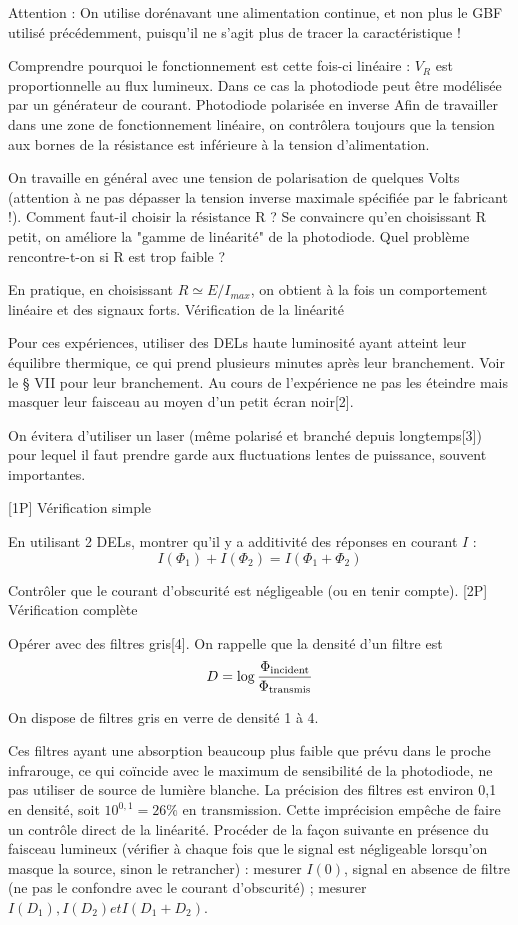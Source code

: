 \documentclass{article}%
\begin{document}
Attention : On utilise dorénavant une alimentation continue, et non plus le GBF utilisé précédemment, puisqu'il ne s'agit plus de tracer la caractéristique !


Comprendre pourquoi le fonctionnement est cette fois-ci linéaire : $V_{R}$ est proportionnelle au flux lumineux. Dans ce cas la photodiode peut être modélisée par un générateur de courant.
Photodiode polarisée en inverse
Afin de travailler dans une zone de fonctionnement linéaire, on contrôlera toujours que la tension aux bornes de la résistance est inférieure à la tension d'alimentation.

On travaille en général avec une tension de polarisation de quelques Volts (attention à ne pas dépasser la tension inverse maximale spécifiée par le fabricant !). Comment faut-il choisir la résistance R ? Se convaincre qu'en choisissant R petit, on améliore la "gamme de linéarité" de la photodiode. Quel problème rencontre-t-on si R est trop faible ?

En pratique, en choisissant $R \simeq E/I_{max}$, on obtient à la fois un comportement linéaire et des signaux forts.
Vérification de la linéarité

Pour ces expériences, utiliser des DELs haute luminosité ayant atteint leur équilibre thermique, ce qui prend plusieurs minutes après leur branchement. Voir le § VII pour leur branchement. Au cours de l'expérience ne pas les éteindre mais masquer leur faisceau au moyen d'un petit écran noir[2].

On évitera d'utiliser un laser (même polarisé et branché depuis longtemps[3]) pour lequel il faut prendre garde aux fluctuations lentes de puissance, souvent importantes.


[1P] Vérification simple

En utilisant 2 DELs, montrer qu'il y a additivité des réponses en courant $I$ :
\[ I(\Phi_1 ) + I(\Phi_2 ) = I(\Phi_1 + \Phi_2 )\]

Contrôler que le courant d'obscurité est négligeable (ou en tenir compte).
[2P] Vérification complète

Opérer avec des filtres gris[4]. On rappelle que la densité d'un filtre est
\[ D = \log \frac{\Phi _{\rm incident} }{\Phi_{\rm transmis} }\]

On dispose de filtres gris en verre de densité 1 à 4.

    Ces filtres ayant une absorption beaucoup plus faible que prévu dans le proche infrarouge, ce qui coïncide avec le maximum de sensibilité de la photodiode, ne pas utiliser de source de lumière blanche.
    La précision des filtres est environ 0,1 en densité, soit $10^{0,1} = 26\%$ en transmission. Cette imprécision empêche de faire un contrôle direct de la linéarité. Procéder de la façon suivante en présence du faisceau lumineux (vérifier à chaque fois que le signal est négligeable lorsqu'on masque la source, sinon le retrancher) :
        mesurer $I(0)$, signal en absence de filtre (ne pas le confondre avec le courant d'obscurité) ;
        mesurer $I(D_{1}), I(D_{2}) et I(D_{1} + D _{2})$.
\end{document}

